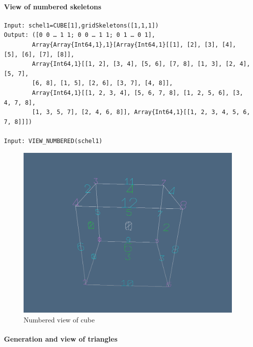 \documentclass{article}
\begin{document}
\paragraph{View of numbered skeletons}
\begin{flushleft} \small

\begin{list}{}{} \item
   \begin{Verbatim}[tabsize=4]
Input: schel1=CUBE[1],gridSkeletons([1,1,1])
Output: ([0 0 … 1 1; 0 0 … 1 1; 0 1 … 0 1],
        Array{Array{Int64,1},1}[Array{Int64,1}[[1], [2], [3], [4], [5], [6], [7], [8]], 
        Array{Int64,1}[[1, 2], [3, 4], [5, 6], [7, 8], [1, 3], [2, 4], [5, 7],
        [6, 8], [1, 5], [2, 6], [3, 7], [4, 8]],
        Array{Int64,1}[[1, 2, 3, 4], [5, 6, 7, 8], [1, 2, 5, 6], [3, 4, 7, 8],
        [1, 3, 5, 7], [2, 4, 6, 8]], Array{Int64,1}[[1, 2, 3, 4, 5, 6, 7, 8]]])

Input: VIEW_NUMBERED(schel1)
   \end{Verbatim}
\end{list}
\end{flushleft}

\begin{figure}[h!]
\centering
\includegraphics[scale=0.6]{numerazioneskel.jpg}
\caption{Numbered view of cube}
\end{figure}

\newpage
\paragraph{Generation and view of triangles}
\end{document}
